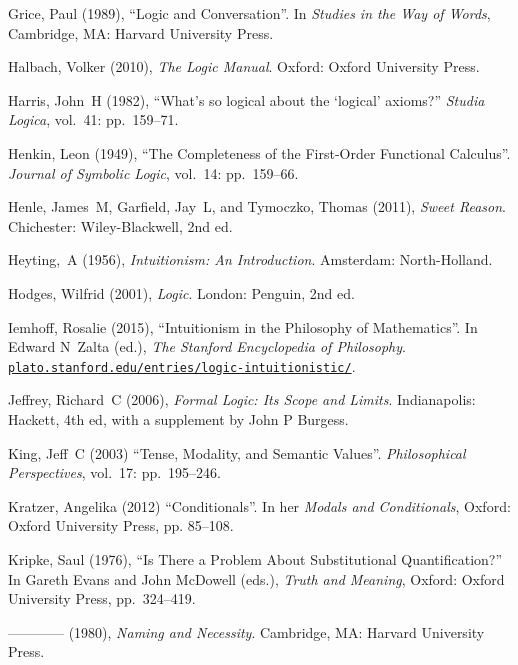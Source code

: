 \documentclass[openany,leqno,10pt]{book}
\theoremstyle{break}
\theoremstyle{definition}
\theoremstyle{remark}
\begin{document}
{\begin{thebibliography}{39}
Grice, Paul (1989), \enquote{Logic and Conversation}. In \emph{Studies in the
  Way of Words}, Cambridge, MA: Harvard University Press.

Halbach, Volker (2010), \emph{The Logic Manual}. Oxford: Oxford University
  Press.

Harris, John~H (1982), \enquote{What's so logical about the `logical' axioms?}
  \emph{Studia Logica}, vol.~41: pp.~159–71.

Henkin, Leon (1949), \enquote{The Completeness of the First-Order Functional
  Calculus}. \emph{Journal of Symbolic Logic}, vol.~14: pp.~159–66.

Henle, James~M, Garfield, Jay~L, and Tymoczko, Thomas (2011), \emph{Sweet Reason}. Chichester: Wiley-Blackwell, 2nd ed.


Heyting,~A (1956), \emph{Intuitionism: An Introduction}. Amsterdam:
  North-Holland.

Hodges, Wilfrid (2001), \emph{Logic}. London: Penguin, 2nd ed.

 Iemhoff, Rosalie (2015), \enquote{Intuitionism in the Philosophy of Mathematics}. In Edward N~Zalta (ed.), \emph{The Stanford Encyclopedia of Philosophy}. \href{http://plato.stanford.edu/entries/logic-intuitionistic/}{\nolinkurl{plato.stanford.edu/entries/logic-intuitionistic/}}.

Jeffrey, Richard~C (2006), \emph{Formal Logic: Its Scope and Limits}. Indianapolis: Hackett, 4th ed, with a supplement by John P Burgess.

King, Jeff~C (2003) \enquote{Tense, Modality, and Semantic Values}. \emph{Philosophical Perspectives}, vol.~17: pp.~195–246. 

Kratzer, Angelika (2012) \enquote{Conditionals}. In her \emph{Modals and Conditionals}, Oxford: Oxford University Press, pp. 85–108.

Kripke, Saul (1976), \enquote{Is There a Problem About Substitutional
  Quantification?} In Gareth Evans and John McDowell (eds.), \emph{Truth and
  Meaning}, Oxford: Oxford University Press, pp.~324–419.

---\!\!---\!\!---\!\!--- (1980), \emph{Naming and Necessity}. Cambridge, MA:
  Harvard University Press.


\end{thebibliography}}
\end{document}

